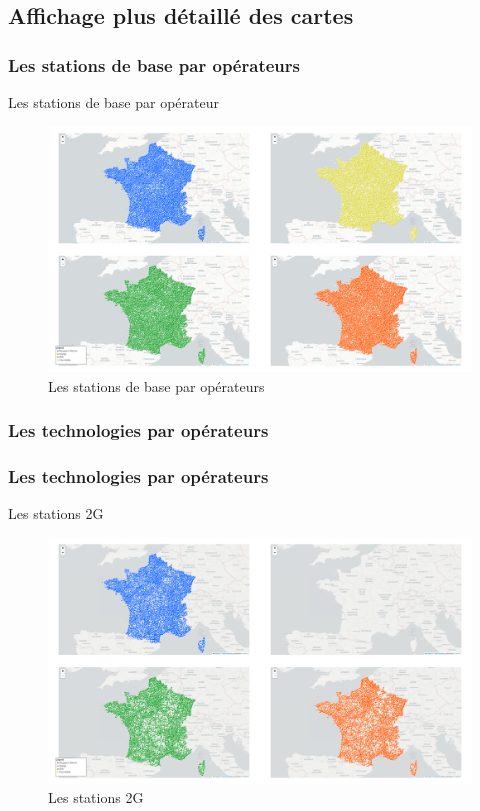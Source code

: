 \subsection{Affichage plus détaillé des cartes}
\insertsubsectionframe

\subsubsection{Les stations de base par opérateurs}
\begin{frame}{Les stations de base par opérateur}
    \begin{figure}
        \includegraphics[width=0.9\paperheight]{images/cartes/subplots-providers.png}
        \caption{\label{fig:sp-prov}Les stations de base par opérateurs}
    \end{figure}
\end{frame}


\subsubsection{Les technologies par opérateurs}
\subsubsection{Les technologies par opérateurs}
\begin{frame}{Les stations 2G}
    \begin{figure}
        \includegraphics[width=0.9\paperheight]{images/cartes/providers-site_2g.png}
        \caption{\label{fig:sp-2g}Les stations 2G}
    \end{figure}
\end{frame}

